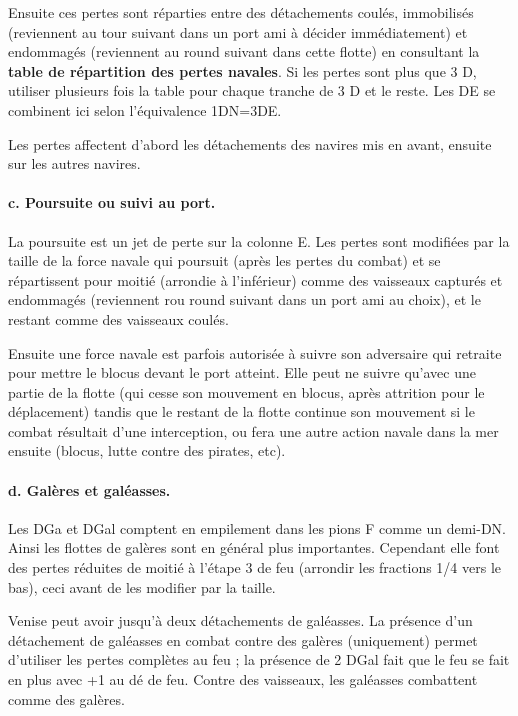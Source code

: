 Ensuite ces pertes sont réparties entre des détachements coulés,
immobilisés (reviennent au tour suivant dans un port ami à
décider immédiatement) et endommagés (reviennent au round suivant dans cette
flotte) en consultant la \textbf{table de répartition des pertes navales}.
Si les pertes sont plus que 3 D, utiliser plusieurs fois la table pour chaque
tranche de 3 D et le reste.
Les DE se combinent ici selon l'équivalence 1DN=3DE.

Les pertes affectent d'abord les détachements des navires mis en avant,
ensuite sur les autres navires.


\paragraph{c. Poursuite ou suivi au port.} La poursuite est un jet de perte
sur la colonne E. Les pertes sont modifiées par la taille de la force navale
qui poursuit (après les pertes du combat) et se répartissent pour moitié (arrondie
à l'inférieur) comme des vaisseaux capturés et endommagés (reviennent rou
round suivant dans un port ami au choix), et le restant comme des vaisseaux
coulés.

Ensuite une force navale est parfois autorisée à suivre son adversaire qui
retraite pour mettre le blocus devant le port atteint. Elle peut ne suivre qu'avec
une partie de la flotte (qui cesse son mouvement en blocus, après attrition
pour le déplacement) tandis que le restant de la flotte continue son
mouvement si le combat résultait d'une interception, ou fera une autre
action navale dans la mer ensuite (blocus, lutte contre des pirates, etc).

\paragraph{d. Galères et galéasses.} Les DGa et DGal comptent en empilement
dans les pions F comme un demi-DN. Ainsi les flottes de galères sont en général
plus importantes. Cependant elle font des pertes réduites de moitié à l'étape 3
de feu (arrondir les fractions 1/4 vers le bas), ceci avant de les modifier par la taille.

Venise peut avoir jusqu'à deux détachements de galéasses. La présence
d'un détachement de galéasses en combat contre des galères (uniquement) permet d'utiliser
les pertes complètes au feu ; la présence de 2 DGal fait que le feu se fait
en plus avec +1 au dé de feu.
Contre des vaisseaux, les galéasses combattent comme des galères.

